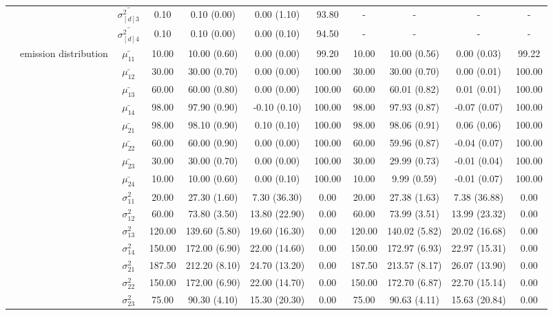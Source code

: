 \begin{table}[h]
{\begin{tabular}{ccccccccccc}
 &  & $\bar{\sigma^2_{[d]3}}$ & 0.10 & 0.10 (0.00) & 0.00 (1.10) & 93.80 & - & - & - & - \\
 &  & $\bar{\sigma^2_{[d]4}}$ & 0.10 & 0.10 (0.00) & 0.00 (0.10) & 94.50 & - & - & - & - \\
 & emission distribution & $\bar{\mu_{11}}$ & 10.00 & 10.00 (0.60) & 0.00 (0.00) & 99.20 & 10.00 & 10.00 (0.56) & 0.00 (0.03) & 99.22 \\
 & \multirow{15}{*}{} & $\bar{\mu_{12}}$ & 30.00 & 30.00 (0.70) & 0.00 (0.00) & 100.00 & 30.00 & 30.00 (0.70) & 0.00 (0.01) & 100.00 \\
 &  & $\bar{\mu_{13}}$ & 60.00 & 60.00 (0.80) & 0.00 (0.00) & 100.00 & 60.00 & 60.01 (0.82) & 0.01 (0.01) & 100.00 \\
 &  & $\bar{\mu_{14}}$ & 98.00 & 97.90 (0.90) & -0.10 (0.10) & 100.00 & 98.00 & 97.93 (0.87) & -0.07 (0.07) & 100.00 \\
 &  & $\bar{\mu_{21}}$ & 98.00 & 98.10 (0.90) & 0.10 (0.10) & 100.00 & 98.00 & 98.06 (0.91) & 0.06 (0.06) & 100.00 \\
 &  & $\bar{\mu_{22}}$ & 60.00 & 60.00 (0.90) & 0.00 (0.00) & 100.00 & 60.00 & 59.96 (0.87) & -0.04 (0.07) & 100.00 \\
 &  & $\bar{\mu_{23}}$ & 30.00 & 30.00 (0.70) & 0.00 (0.00) & 100.00 & 30.00 & 29.99 (0.73) & -0.01 (0.04) & 100.00 \\
 &  & $\bar{\mu_{24}}$ & 10.00 & 10.00 (0.60) & 0.00 (0.10) & 100.00 & 10.00 & 9.99 (0.59) & -0.01 (0.07) & 100.00 \\
 &  & $\sigma^2_{11}$ & 20.00 & 27.30 (1.60) & 7.30 (36.30) & 0.00 & 20.00 & 27.38 (1.63) & 7.38 (36.88) & 0.00 \\
 &  & $\sigma^2_{12}$ & 60.00 & 73.80 (3.50) & 13.80 (22.90) & 0.00 & 60.00 & 73.99 (3.51) & 13.99 (23.32) & 0.00 \\
 &  & $\sigma^2_{13}$ & 120.00 & 139.60 (5.80) & 19.60 (16.30) & 0.00 & 120.00 & 140.02 (5.82) & 20.02 (16.68) & 0.00 \\
 &  & $\sigma^2_{14}$ & 150.00 & 172.00 (6.90) & 22.00 (14.60) & 0.00 & 150.00 & 172.97 (6.93) & 22.97 (15.31) & 0.00 \\
 &  & $\sigma^2_{21}$ & 187.50 & 212.20 (8.10) & 24.70 (13.20) & 0.00 & 187.50 & 213.57 (8.17) & 26.07 (13.90) & 0.00 \\
 &  & $\sigma^2_{22}$ & 150.00 & 172.00 (6.90) & 22.00 (14.70) & 0.00 & 150.00 & 172.70 (6.87) & 22.70 (15.14) & 0.00 \\
 &  & $\sigma^2_{23}$ & 75.00 & 90.30 (4.10) & 15.30 (20.30) & 0.00 & 75.00 & 90.63 (4.11) & 15.63 (20.84) & 0.00 \\

\end{tabular}}
\end{table}
